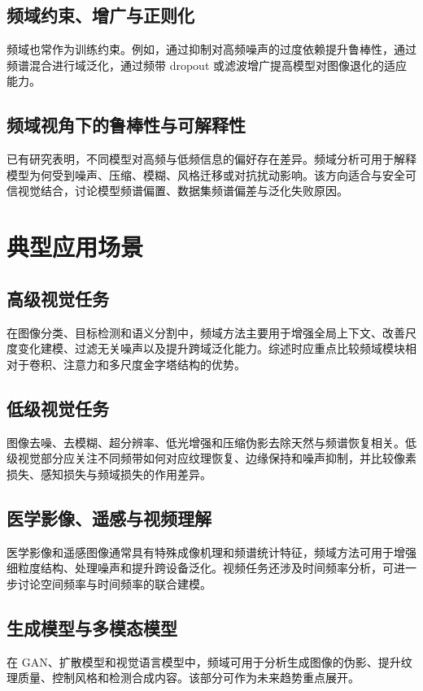 \documentclass[12pt,a4paper]{article}
\begin{document}
\subsection{频域约束、增广与正则化}
频域也常作为训练约束。例如，通过抑制对高频噪声的过度依赖提升鲁棒性，通过频谱混合进行域泛化，通过频带 dropout 或滤波增广提高模型对图像退化的适应能力。

\subsection{频域视角下的鲁棒性与可解释性}
已有研究表明，不同模型对高频与低频信息的偏好存在差异。频域分析可用于解释模型为何受到噪声、压缩、模糊、风格迁移或对抗扰动影响。该方向适合与安全可信视觉结合，讨论模型频谱偏置、数据集频谱偏差与泛化失败原因。

\section{典型应用场景}
\subsection{高级视觉任务}
在图像分类、目标检测和语义分割中，频域方法主要用于增强全局上下文、改善尺度变化建模、过滤无关噪声以及提升跨域泛化能力。综述时应重点比较频域模块相对于卷积、注意力和多尺度金字塔结构的优势。

\subsection{低级视觉任务}
图像去噪、去模糊、超分辨率、低光增强和压缩伪影去除天然与频谱恢复相关。低级视觉部分应关注不同频带如何对应纹理恢复、边缘保持和噪声抑制，并比较像素损失、感知损失与频域损失的作用差异。

\subsection{医学影像、遥感与视频理解}
医学影像和遥感图像通常具有特殊成像机理和频谱统计特征，频域方法可用于增强细粒度结构、处理噪声和提升跨设备泛化。视频任务还涉及时间频率分析，可进一步讨论空间频率与时间频率的联合建模。

\subsection{生成模型与多模态模型}
在 GAN、扩散模型和视觉语言模型中，频域可用于分析生成图像的伪影、提升纹理质量、控制风格和检测合成内容。该部分可作为未来趋势重点展开。
\end{document}
